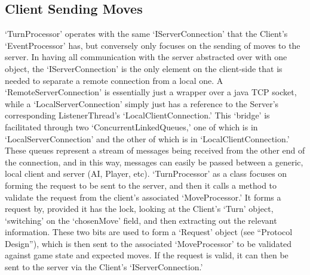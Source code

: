 \documentclass[a4paper,doc,draftfirst]{apa6}
\begin{document}
\subsection{Client Sending Moves}
‘TurnProcessor’ operates with the same ‘IServerConnection’ that the Client’s ‘EventProcessor’ has, but conversely only focuses on the sending of moves to the server. In having all communication with the server abstracted over with one object, the ‘IServerConnection’ is the only element on the client-side that is needed to separate a remote connection from a local one. A ‘RemoteServerConnection’ is essentially just a wrapper over a java TCP socket, while a ‘LocalServerConnection’ simply just has a reference to the Server’s corresponding ListenerThread’s ‘LocalClientConnection.’ This ‘bridge’ is facilitated through two ‘ConcurrentLinkedQueues,’ one of which is in ‘LocalServerConnection’ and the other of which is in ‘LocalClientConnection.’ These queues represent a stream of messages being received from the other end of the connection, and in this way, messages can easily be passed between a generic, local client and server (AI, Player, etc). ‘TurnProcessor’ as a class focuses on forming the request to be sent to the server, and then it calls a method to validate the request from the client’s associated ‘MoveProcessor.’ It forms a request by, provided it has the lock, looking at the Client’s ‘Turn’ object, ‘switching’ on the ‘chosenMove’ field, and then extracting out the relevant information. These two bits are used to form a ‘Request’ object (see  “Protocol Design”), which is then sent to the associated ‘MoveProcessor’ to be validated against game state and expected moves. If the request is valid, it can then be sent to the server via the Client’s ‘IServerConnection.’
\end{document}
